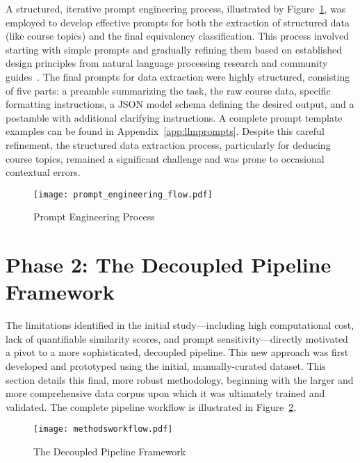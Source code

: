 A structured, iterative prompt engineering process, illustrated by Figure~\ref{fig:prompt_engineering_process}, was employed to develop effective prompts for both the extraction of structured data (like course topics) and the final equivalency classification. This process involved starting with simple prompts and gradually refining them based on established design principles from natural language processing research and community guides~\cite{ye2024promptengineeringpromptengineer,ppp,peg}. The final prompts for data extraction were highly structured, consisting of five parts: a preamble summarizing the task, the raw course data, specific formatting instructions, a JSON model schema defining the desired output, and a postamble with additional clarifying instructions. A complete prompt template examples can be found in Appendix~\ref{app:llmprompts}. Despite this careful refinement, the structured data extraction process, particularly for deducing course topics, remained a significant challenge and was prone to occasional contextual errors.

\begin{figure}[tb]
    \captionsetup{skip=5pt}
    \centering
    \texttt{[image: prompt\_engineering\_flow.pdf]}
    \caption{Prompt Engineering Process}
    \label{fig:prompt_engineering_process}
\end{figure}

\section{Phase 2: The Decoupled Pipeline Framework}\label{ch:3.2}
The limitations identified in the initial study—including high computational cost, lack of quantifiable similarity scores, and prompt sensitivity—directly motivated a pivot to a more sophisticated, decoupled pipeline. This new approach was first developed and prototyped using the initial, manually-curated dataset. This section details this final, more robust methodology, beginning with the larger and more comprehensive data corpus upon which it was ultimately trained and validated.  The complete pipeline workflow is illustrated in Figure~\ref{fig:ftpipeline}.

\begin{figure}[tb]
    \captionsetup{skip=5pt}
    \centering
    \texttt{[image: methodsworkflow.pdf]}
    \caption{The Decoupled Pipeline Framework}
    \label{fig:ftpipeline}
\end{figure}

